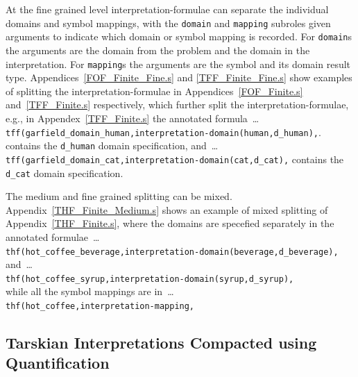 \documentclass{easychair}
\newcommand{\smalltt}[1]{\small \texttt{#1}}
\begin{document}
At the fine grained level interpretation-formulae can separate the individual domains and symbol 
mappings, with the {\tt domain} and {\tt mapping} subroles given arguments to indicate
which domain or symbol mapping is recorded.
For {\tt domain}s the arguments are the domain from the problem and the domain in the 
interpretation.
For {\tt mapping}s the arguments are the symbol and its domain result type.
Appendices~\ref{FOF_Finite_Fine.s} and \ref{TFF_Finite_Fine.s} show examples of splitting the 
interpretation-formulae in Appendices~\ref{FOF_Finite.s} and~\ref{TFF_Finite.s} respectively, 
which further split the interpretation-formulae, e.g., in Appendex~\ref{TFF_Finite.s} the 
annotated formula~\ldots \\
\hspace*{1.0em}\smalltt{tff(garfield\_domain\_human,interpretation-domain(human,d\_human),}.
contains the {\tt d\_human} domain specification, and~\ldots \\
\hspace*{1.0em}\smalltt{tff(garfield\_domain\_cat,interpretation-domain(cat,d\_cat),}
contains the {\tt d\_cat} domain specification.

The medium and fine grained splitting can be mixed.
Appendix~\ref{THF_Finite_Medium.s} shows an example of mixed splitting of 
Appendix~\ref{THF_Finite.s}, where the domains are specefied separately in the annotated
formulae~\ldots \\
\hspace*{1.0em}\smalltt{thf(hot\_coffee\_beverage,interpretation-domain(beverage,d\_beverage),} \\
and~\ldots \\
\hspace*{1.0em}\smalltt{thf(hot\_coffee\_syrup,interpretation-domain(syrup,d\_syrup),} \\
while all the symbol mappings are in~\ldots \\
\hspace*{1.0em}\smalltt{thf(hot\_coffee,interpretation-mapping,}

\subsection{Tarskian Interpretations Compacted using Quantification}
\label{NewTarskianCompact}
\end{document}
